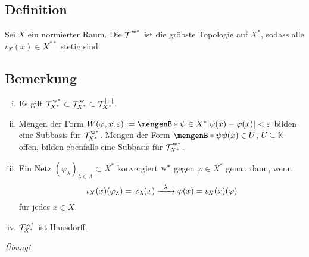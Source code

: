 \subsection[Definition: Die $\w^*$-Topologie auf $X^*$]{Definition} %
\label{sub:58}
Sei $X$ ein normierter Raum. Die  $\weakTstar{ }$ ist die gröbste Topologie auf $X^*$, sodass alle $\iota_X(x) \in X^{**}$ stetig sind.

\subsection[Bemerkungen zur $\w^*$-Topologie auf $X^*$]{Bemerkung} %
\label{sub:59}
\begin{enumerate}[(i)]
	\item Es gilt $\weakTstar{X^*} \subset \weakT{X^*} \subset \mathcal{T}^{\norm{\cdot}}_{X^*}$.
	\item Mengen der Form $W(\varphi,x, \varepsilon) := \set[\psi \in X^*]{\abs*{\psi(x)- \varphi(x)}< \varepsilon}$ bilden eine Subbasis für $\weakTstar{X^*}$.
	Mengen der Form $\set[\psi]{ \psi(x) \in U}$, $U \subseteq \mathds{K}$ offen, bilden ebenfalls eine Subbasis für $\weakTstar{X^*}$.
	\item Ein Netz $(\varphi_\lambda)_{\lambda \in \Lambda} \subset X^*$ konvergiert $\w^*$ gegen $\varphi \in X^*$ genau dann, wenn 
	\[
		\iota_X(x)(\varphi_\lambda)=\varphi_\lambda(x) \xrightarrow{\minwidthbox{\lambda}{1.5em}} \varphi(x) = \iota_X(x)(\varphi)
	\]
	für jedes $x \in X$.
	\item $\weakTstar{X^*}$ ist Hausdorff.
\end{enumerate}
\emph{Übung!} 

